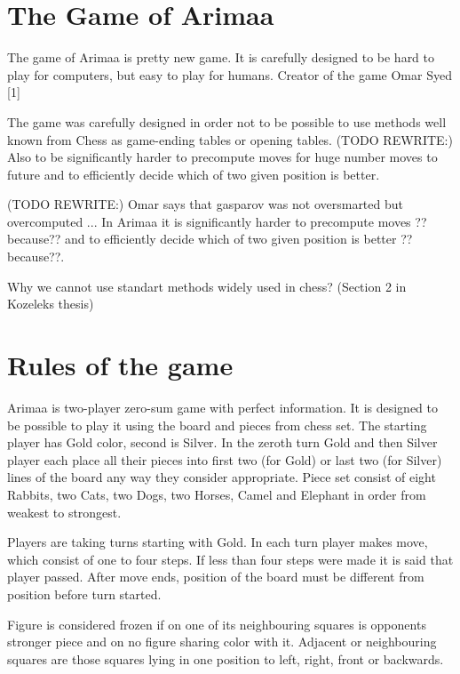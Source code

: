 \section{The Game of Arimaa}
The game of Arimaa is pretty new game. It is carefully designed to be hard to
play for computers, but easy to play for humans. Creator of the game Omar
Syed [1]

The game was carefully designed in order not to be possible to use methods
well known from Chess as game-ending tables or opening tables. (TODO
REWRITE:) Also to be significantly harder to precompute moves for huge
number moves to future and to efficiently decide which of two given position
is better.

(TODO REWRITE:) Omar says that gasparov was not oversmarted but overcomputed ...
In Arimaa it is significantly harder to precompute moves ??because?? and to
efficiently decide which of two given position is better ??because??.

Why we cannot use standart methods widely used in chess? (Section 2 in Kozeleks thesis)

\section{Rules of the game\cite{arimaa.com}}
Arimaa is two-player zero-sum game with perfect information. It is designed to
be possible to play it using the board and pieces from chess set. The starting
player has Gold color, second is Silver. In the zeroth turn Gold and then
Silver player each place all their pieces into first two (for Gold) or last two
(for Silver) lines of the board any way they consider appropriate. Piece set
consist of eight Rabbits, two Cats, two Dogs, two Horses, Camel and Elephant in
order from weakest to strongest.


Players are taking turns starting with Gold. In each turn player makes move,
which consist of one to four steps. If less than four steps were made it is
said that player passed. After move ends, position of the board must be
different from position before turn started.

Figure is considered frozen if on one of its neighbouring squares is opponents
stronger piece and on no figure sharing color with it. Adjacent or neighbouring
squares are those squares lying in one position to left, right, front or
backwards.


